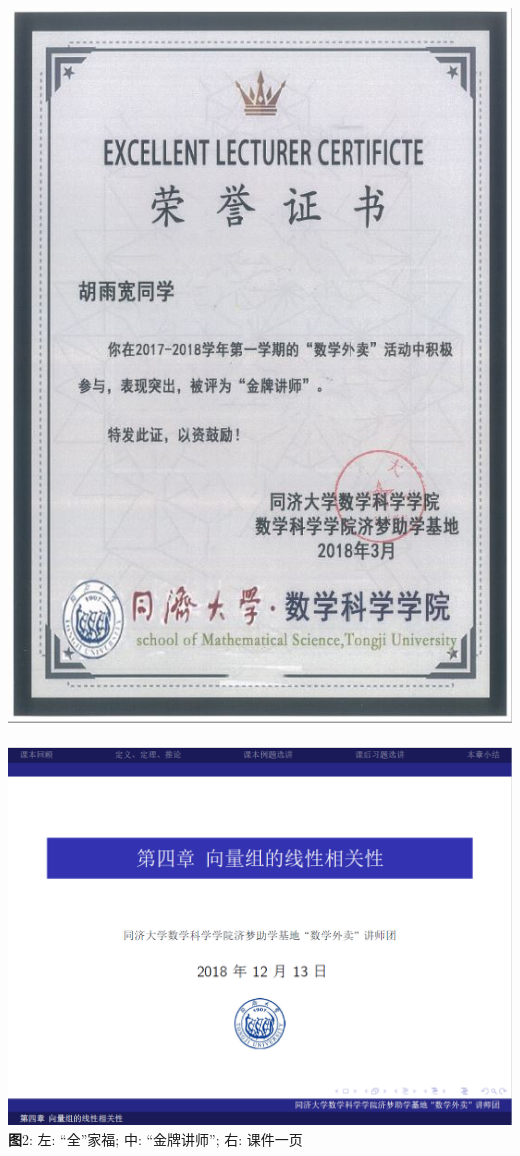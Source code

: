 \documentclass[10pt]{beamer}
\begin{document}
\begin{frame}
\begin{center}
\includegraphics[width=.15\paperwidth]{gold.jpg}$\quad$
\includegraphics[width=.28\paperwidth]{slide.png}\\
\footnotesize \textbf{图}2: 左: ``全''家福; 中: ``金牌讲师''; 右: 课件一页
\end{center}
\end{frame}
\end{document}
